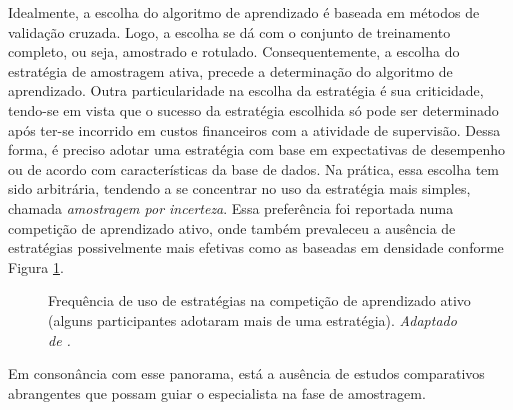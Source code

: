 Idealmente, a escolha do algoritmo de aprendizado é baseada em métodos de validação
cruzada. Logo, a escolha se dá com o conjunto de treinamento completo, ou seja,
amostrado e rotulado.
Consequentemente, a escolha do estratégia de amostragem ativa,
precede a determinação do algoritmo de aprendizado.
Outra particularidade na escolha da estratégia é
sua criticidade, tendo-se em vista que o sucesso da estratégia escolhida só pode ser
determinado após ter-se incorrido em custos financeiros com a atividade de supervisão.
Dessa forma, é preciso adotar uma estratégia com base em expectativas de desempenho
ou de acordo com características da base de dados.
Na prática, essa escolha tem sido arbitrária, tendendo a se concentrar
no uso da estratégia mais simples, chamada \textit{amostragem por incerteza}.
Essa preferência foi reportada numa competição de aprendizado ativo,
onde também prevaleceu a ausência de estratégias possivelmente mais efetivas
como as baseadas em densidade conforme
Figura \ref{compet}.
\begin{figure}
\caption{Frequência de uso de estratégias na competição de aprendizado ativo
(alguns participantes adotaram mais de uma estratégia).
\textit{Adaptado de \citep{journals/jmlr/GuyonCDL11}.}}
\label{compet}
\begin{center}
\end{center}
\end{figure}
Em consonância com esse panorama, está a ausência de estudos comparativos
abrangentes que possam guiar o especialista na fase de amostragem.

